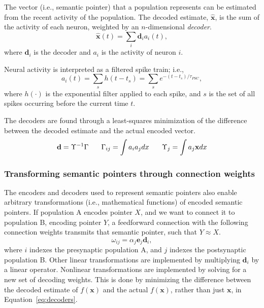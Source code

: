 \documentclass[10pt,letterpaper]{article}
\begin{document}
The vector (i.e., semantic pointer)
that a population represents
can be estimated from the recent activity
of the population.
The decoded estimate, $\mathbf{\hat{x}}$,
is the sum of the activity of each neuron,
weighted by an $n$-dimensional \textit{decoder}.
\begin{equation}
  \mathbf{\hat{x}}(t) = \sum_i \mathbf{d}_i a_i(t),
\end{equation}
where $\mathbf{d}_i$ is the decoder
and $a_i$ is the activity of neuron $i$.

Neural activity is interpreted as a
filtered spike train; i.e.,
\begin{equation} \label{eq:filter-spikes}
  a_i(t) = \sum_s h(t - t_s) = \sum_s e^{-(t - t_s) / \tau_{PSC}},
\end{equation}
where $h(\cdot)$ is the exponential filter
applied to each spike,
and $s$ is the set of all spikes occurring
before the current time $t$.

The decoders are found through a least-squares minimization
of the difference between the decoded estimate
and the actual encoded vector.
\begin{equation} \label{eq:decoders}
  \mathbf{d} = \Upsilon^{-1} \Gamma \hspace{1.8em}
  \Gamma_{ij} = \int a_i a_j dx \hspace{1.8em}
  \Upsilon_j = \int a_j \mathbf{x} dx
\end{equation}

\subsubsection{Transforming semantic pointers through connection weights}

The encoders and decoders used to represent semantic pointers
also enable arbitrary transformations
(i.e., mathematical functions) of encoded semantic pointers.
If population A encodes pointer $X$,
and we want to connect it to population B, encoding pointer $Y$,
a feedforward connection with the following connection weights
transmits that semantic pointer, such that $Y \approx X$.
\begin{equation}
  \omega_{ij} = \alpha_j \mathbf{e}_j \mathbf{d}_i,
\end{equation}
where $i$ indexes the presynaptic population A,
and $j$ indexes the postsynaptic population B.
Other linear transformations
are implemented by multiplying $\mathbf{d}_i$
by a linear operator.
Nonlinear transformations are implemented
by solving for a new set of decoding weights.
This is done by minimizing the difference between
the decoded estimate of $f(\mathbf{x})$
and the actual $f(\mathbf{x})$,
rather than just $\mathbf{x}$, in Equation~\eqref{eq:decoders}.
\end{document}
